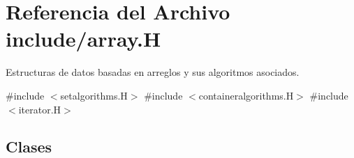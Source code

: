 \hypertarget{array_8_h}{}\section{Referencia del Archivo include/array.H}
\label{array_8_h}


Estructuras de datos basadas en arreglos y sus algoritmos asociados.  


{\ttfamily \#include $<$setalgorithms.\+H$>$}\newline
{\ttfamily \#include $<$containeralgorithms.\+H$>$}\newline
{\ttfamily \#include $<$iterator.\+H$>$}\newline
\subsection*{Clases}

